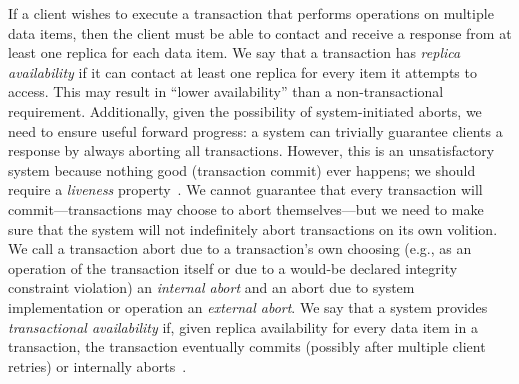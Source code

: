 If a client wishes to execute a transaction that performs operations
on multiple data items, then the client must be able to contact and
receive a response from at least one replica for each data item. We
say that a transaction has \emph{replica availability} if it can
contact at least one replica for every item it attempts to
access. This may result in ``lower availability'' than a
non-transactional requirement. Additionally, given the possibility of
system-initiated aborts, we need to ensure useful forward progress: a
system can trivially guarantee clients a response by always aborting
all transactions. However, this is an unsatisfactory system because
nothing good (transaction commit) ever happens; we should require a
\textit{liveness} property~\cite{transaction-liveness}. We cannot
guarantee that every transaction will commit---transactions may choose
to abort themselves---but we need to make sure that the system will
not indefinitely abort transactions on its own volition. We call a
transaction abort due to a transaction's own choosing (e.g., as an
operation of the transaction itself or due to a would-be declared
integrity constraint violation) an \textit{internal abort} and an
abort due to system implementation or operation an \textit{external
  abort}. We say that a system provides \textit{transactional
  availability} if, given replica availability for every data item in
a transaction, the transaction eventually commits (possibly after
multiple client retries) or internally aborts~\cite{hat-hotos}.

